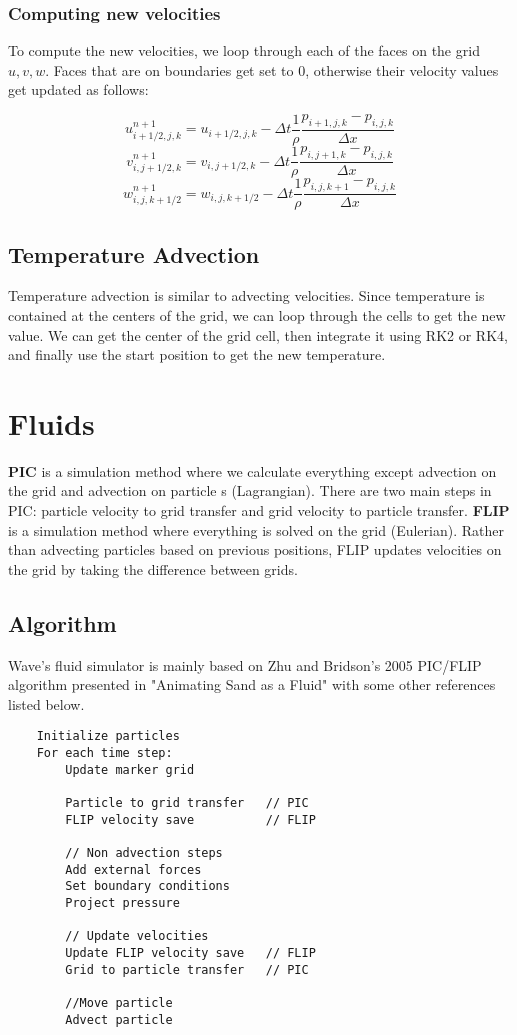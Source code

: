 \documentclass[a4paper]{article}
\begin{document}
    \subsubsection*{Computing new velocities}
    To compute the new velocities, we loop through each of the faces on the grid $u, v, w$. Faces that are on boundaries get set to 0, otherwise their velocity values get updated as follows:
    
    \[ u^{n+1}_{i+1/2,j,k} = u_{i+1/2,j,k} - \Delta t \frac{1}{\rho} \frac{p_{i+1,j,k} - p_{i,j,k}}{\Delta x}\]
    \[ v^{n+1}_{i,j+1/2,k} = v_{i,j+1/2,k} - \Delta t \frac{1}{\rho} \frac{p_{i,j+1,k} - p_{i,j,k}}{\Delta x}\]
    \[ w^{n+1}_{i,j,k+1/2} = w_{i,j,k+1/2} - \Delta t \frac{1}{\rho} \frac{p_{i,j,k+1} - p_{i,j,k}}{\Delta x}\]
    
    \subsection{Temperature Advection}
    Temperature advection is similar to advecting velocities. Since temperature is contained at the centers of the grid, we can loop through the cells to get the new value. We can get the center of the grid cell, then integrate it using RK2 or RK4, and finally use the start position to get the new temperature.
    
    \section{Fluids}
    \textbf{PIC} is a simulation method where we calculate everything except advection on the grid and advection on particle s (Lagrangian). There are two main steps in PIC: particle velocity to grid transfer and grid velocity to particle transfer. \newline
    \noindent \textbf{FLIP} is a simulation method where everything is solved on the grid (Eulerian). Rather than advecting particles based on previous positions, FLIP updates velocities on the grid by taking the difference between grids. 
    
    \subsection{Algorithm}
    Wave's fluid simulator is mainly based on Zhu and Bridson's 2005 PIC/FLIP algorithm presented in "Animating Sand as a Fluid" with some other references listed below. 
    \begin{lstlisting}
    Initialize particles
    For each time step:
        Update marker grid
        
        Particle to grid transfer	// PIC
        FLIP velocity save			// FLIP
    
        // Non advection steps
        Add external forces
        Set boundary conditions
        Project pressure
        
        // Update velocities
        Update FLIP velocity save	// FLIP
        Grid to particle transfer	// PIC
        
        //Move particle
        Advect particle
    \end{lstlisting}
    
\end{document}
